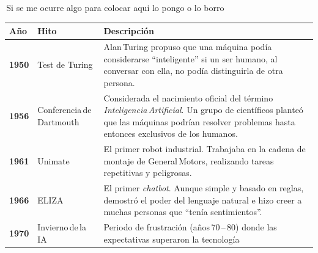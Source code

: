 \documentclass[
  spanish,
  letterpaper,
  DIV=11,
  numbers=noendperiod,
  oneside]{scrreprt}
\newcounter{none} %
\begin{document}
\,Si se me ocurre algo para colocar aqui lo pongo o lo borro

\begin{tcolorbox}[enhanced jigsaw, arc=.35mm, bottomrule=.15mm, bottomtitle=1mm, breakable, colback=white, colbacktitle=quarto-callout-note-color!10!white, colframe=quarto-callout-note-color-frame, coltitle=black, left=2mm, leftrule=.75mm, opacityback=0, opacitybacktitle=0.6, rightrule=.15mm, title=\textcolor{quarto-callout-note-color}{\faInfo}\hspace{0.5em}{Detalle de los hitos históricos (Click para expandir)}, titlerule=0mm, toprule=.15mm, toptitle=1mm]

{\def\LTcaptype{none} %
\begin{longtable}[]{@{}
  >{\raggedright\arraybackslash}p{}
  >{\raggedright\arraybackslash}p{}
  >{\raggedright\arraybackslash}p{}@{}}
\toprule\noalign{}
\begin{minipage}[b]{\linewidth}\raggedright
Año
\end{minipage} & \begin{minipage}[b]{\linewidth}\raggedright
Hito
\end{minipage} & \begin{minipage}[b]{\linewidth}\raggedright
Descripción
\end{minipage} \\
\midrule\noalign{}
\endhead
\bottomrule\noalign{}
\endlastfoot
\textbf{1950} & Test de Turing & Alan\,Turing propuso que una máquina
podía considerarse ``inteligente'' si un ser humano, al conversar con
ella, no podía distinguirla de otra persona. \\
\textbf{1956} & Conferencia\,de\,Dartmouth & Considerada el nacimiento
oficial del término \emph{Inteligencia\,Artificial}. Un grupo de
científicos planteó que las máquinas podrían resolver problemas hasta
entonces exclusivos de los humanos. \\
\textbf{1961} & Unimate & El primer robot industrial. Trabajaba en la
cadena de montaje de General\,Motors, realizando tareas repetitivas y
peligrosas. \\
\textbf{1966} & ELIZA & El primer \emph{chatbot}. Aunque simple y basado
en reglas, demostró el poder del lenguaje natural e hizo creer a muchas
personas que ``tenía sentimientos''. \\
\textbf{1970} & Invierno\,de\,la\,IA & Periodo de frustración
(años\,70\,--\,80) donde las expectativas superaron la tecnología

\end{longtable}}
\end{tcolorbox}
\end{document}
